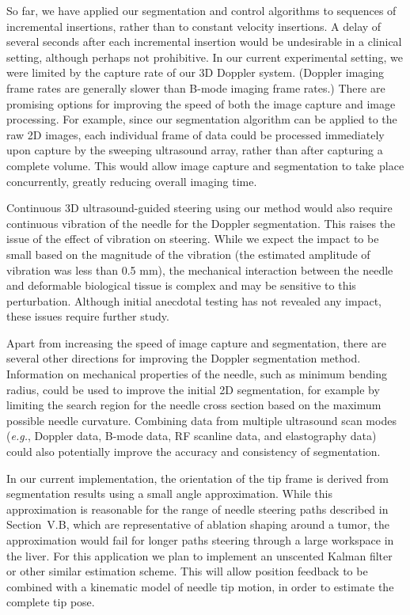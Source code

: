 So far, we have applied our segmentation and control algorithms to sequences of incremental insertions, rather than to constant velocity insertions. A delay of several seconds after each incremental insertion would be undesirable in a clinical setting, although perhaps not prohibitive. In our current experimental setting, we were limited by the capture rate of our 3D Doppler system. (Doppler imaging frame rates are generally slower than B-mode imaging frame rates.) There are promising options for improving the speed of both the image capture and image processing. For example, since our segmentation algorithm can be applied to the raw 2D images, each individual frame of data could be processed immediately upon capture by the sweeping ultrasound array, rather than after capturing a complete volume. This would allow image capture and segmentation to take place concurrently, greatly reducing overall imaging time. 

Continuous 3D ultrasound-guided steering using our method would also require continuous vibration of the needle for the Doppler segmentation. This raises the issue of the effect of vibration on steering. While we expect the impact to be small based on the magnitude of the vibration (the estimated amplitude of vibration was less than 0.5 mm), the mechanical interaction between the needle and deformable biological tissue is complex and may be sensitive to this perturbation. Although initial anecdotal testing has not revealed any impact, these issues require further study.

Apart from increasing the speed of image capture and segmentation, there are several other directions for improving the Doppler segmentation method. Information on mechanical properties of the needle, such as minimum bending radius, could be used to improve the initial 2D segmentation, for example by limiting the search region for the needle cross section based on the maximum possible needle curvature. Combining data from multiple ultrasound scan modes (\textit{e.g.}, Doppler data, B-mode data, RF scanline data, and elastography data) could also potentially improve the accuracy and consistency of segmentation. 

In our current implementation, the orientation of the tip frame is derived from segmentation results using a small angle approximation. While this approximation is reasonable for the range of needle steering paths described in Section~V.B, which are representative of ablation shaping around a tumor, the approximation would fail for longer paths steering through a large workspace in the liver. For this application we plan to implement an unscented Kalman filter or other similar estimation scheme. This will allow position feedback to be combined with a kinematic model of needle tip motion, in order to estimate the complete tip pose.

